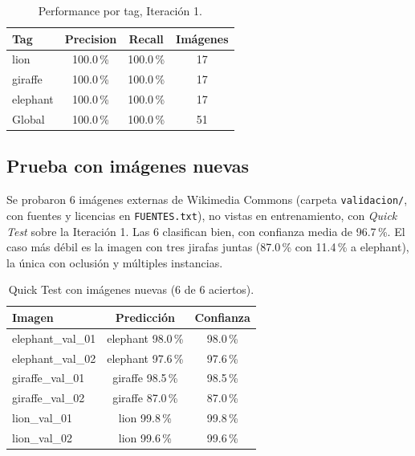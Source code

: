 \documentclass[a4paper,11pt]{article}
\begin{document}
  \begin{table}[H]
    \centering
    \caption{Performance por tag, Iteraci\'on 1.}
    \label{tab:performance}
    \begin{tabular}{lccc}
      \toprule
      Tag & Precision & Recall & Im\'agenes \\
      \midrule
      lion & 100.0\,\% & 100.0\,\% & 17 \\
      giraffe & 100.0\,\% & 100.0\,\% & 17 \\
      elephant & 100.0\,\% & 100.0\,\% & 17 \\
      \midrule
      Global & 100.0\,\% & 100.0\,\% & 51 \\
      \bottomrule
    \end{tabular}
  \end{table}

  \subsection{Prueba con im\'agenes nuevas}
  Se probaron 6 im\'agenes externas de Wikimedia Commons (carpeta
  \texttt{validacion/}, con fuentes y licencias en \texttt{FUENTES.txt}), no
  vistas en entrenamiento, con \textit{Quick Test} sobre la Iteraci\'on 1. Las
  6 clasifican bien, con confianza media de 96.7\,\%. El caso m\'as d\'ebil es
  la imagen con tres jirafas juntas (87.0\,\% con 11.4\,\% a elephant), la
  \'unica con oclusi\'on y m\'ultiples instancias.

  \begin{table}[H]
    \centering
    \caption{Quick Test con im\'agenes nuevas (6 de 6 aciertos).}
    \label{tab:quicktest}
    \begin{tabular}{lcc}
      \toprule
      Imagen & Predicci\'on & Confianza \\
      \midrule
      elephant\_val\_01 & elephant 98.0\,\% & 98.0\,\% \\
      elephant\_val\_02 & elephant 97.6\,\% & 97.6\,\% \\
      giraffe\_val\_01 & giraffe 98.5\,\% & 98.5\,\% \\
      giraffe\_val\_02 & giraffe 87.0\,\% & 87.0\,\% \\
      lion\_val\_01 & lion 99.8\,\% & 99.8\,\% \\
      lion\_val\_02 & lion 99.6\,\% & 99.6\,\% \\
      \bottomrule
    \end{tabular}
  \end{table}
\end{document}
